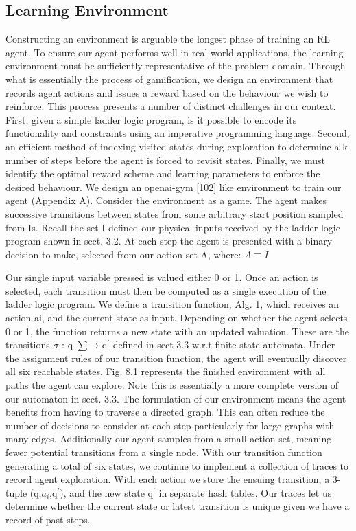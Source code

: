 \documentclass[runningheads]{llncs}
\begin{document}
\subsection{Learning Environment}
Constructing an environment is arguable the longest phase of training an RL agent. To
ensure our agent performs well in real-world applications, the learning environment must
be sufficiently representative of the problem domain. Through what is essentially the
process of gamification, we design an environment that records agent actions and issues a
reward based on the behaviour we wish to reinforce. This process presents a number of
distinct challenges in our context. First, given a simple ladder logic program, is it possible
to encode its functionality and constraints using an imperative programming language.
Second, an efficient method of indexing visited states during exploration to determine a
k-number of steps before the agent is forced to revisit states. Finally, we must identify the
optimal reward scheme and learning parameters to enforce the desired behaviour. We design an openai-gym [102] like environment to train our agent (Appendix A).
Consider the environment as a game. The agent makes successive transitions between
states from some arbitrary start position sampled from Is. Recall the set I  defined our physical inputs received by the ladder logic program shown in sect. 3.2. At each step the
agent is presented with a binary decision to make, selected from our action set A, where: $A \equiv I$

Our single input variable pressed is valued either 0 or 1. Once an action is selected, each
transition must then be computed as a single execution of the ladder logic program. We
define a transition function, Alg. 1, which receives an action ai, and the current state as
input. Depending on whether the agent selects 0 or 1, the function returns a new state
with an updated valuation. These are the transitions $\sigma$ : q $\sum$→ q$^{\prime}$ defined in sect 3.3 w.r.t
finite state automata. Under the assignment rules of our transition function, the agent will
eventually discover all six reachable states. Fig. 8.1 represents the finished environment
with all paths the agent can explore. Note this is essentially a more complete version of
our automaton in sect. 3.3. The formulation of our environment means the agent benefits
from having to traverse a directed graph. This can often reduce the number of decisions to
consider at each step particularly for large graphs with many edges. Additionally our agent
samples from a small action set, meaning fewer potential transitions from a single node. With our transition function generating a total of six states, we continue to implement
a collection of traces to record agent exploration. With each action we store the ensuing
transition, a 3-tuple (q,$a_{i}$,q$^{\prime}$), and the new state q$^{\prime}$ in separate hash tables. Our traces let us determine whether the current state or latest transition is unique given we have
a record of past steps.
\end{document}
